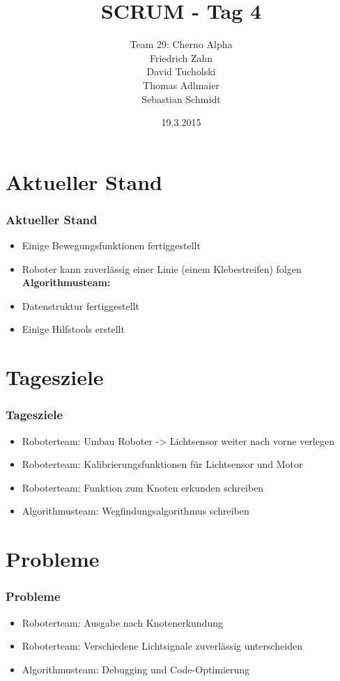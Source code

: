 \documentclass[ddcfooter,nototalpage]{tudbeamer}
\begin{document}
\title{SCRUM - Tag 4}
\author{Team 29: Cherno Alpha \\
Friedrich Zahn \\
David Tucholski \\
Thomas Adlmaier \\
Sebastian Schmidt
}
\date{19.3.2015}
\maketitle
\section{Aktueller Stand}
\begin{frame}
\frametitle{Aktueller Stand}
\normalsize
\begin{itemize}
\textbf{Roboterteam:}
\item Einige Bewegungsfunktionen fertiggestellt
\item Roboter kann zuverlässig einer Linie (einem Klebestreifen) folgen
\textbf{Algorithmusteam:}
\item Datenstruktur fertiggestellt
\item Einige Hilfstools erstellt
\end{itemize}
\end{frame}
\section{Tagesziele}
\begin{frame}
\frametitle{Tagesziele}
\normalsize
\begin{itemize}
\item Roboterteam: Umbau Roboter -> Lichtsensor weiter nach vorne  verlegen
\item Roboterteam: Kalibrierungsfunktionen für Lichtsensor und Motor
\item Roboterteam: Funktion zum Knoten erkunden schreiben
\item Algorithmusteam: Wegfindungsalgorithmus schreiben
\end{itemize}
\end{frame}
\section{Probleme}
\begin{frame}
\frametitle{Probleme}
\normalsize
\begin{itemize}
\item Roboterteam: Ausgabe nach Knotenerkundung
\item Roboterteam: Verschiedene Lichtsignale zuverlässig unterscheiden
\item Algorithmusteam: Debugging und Code-Optimierung
\end{itemize}
\end{frame}
\end{document}

